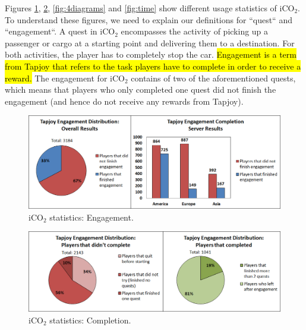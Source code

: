 \documentclass[preprint,authoryear,12pt]{elsarticle}
\newcommand{\hlc}[2][yellow]{ {\sethlcolor{#1} \hl{#2}} }
\begin{document}
Figures \ref{fig:engagement}, \ref{fig:completion}, \ref{fig:4diagrams} and \ref{fig:time} show different usage statistics of iCO$_2$. To understand these figures, we need to explain our definitions for ``quest`` and ``engagement``. A quest in iCO$_2$ encompasses the activity of picking up a passenger or cargo at a starting point and delivering them to a destination. For both activities, the player has to completely stop the car. 
\hlc[green]{Engagement is a term from Tapjoy that refers to the task players have to complete in order to receive a reward.} The engagement for iCO$_2$ contains of two of the aforementioned quests, which means that players who only completed one quest did not finish the engagement (and hence do not receive any rewards from Tapjoy).

\begin{figure}[htb]
	\begin{center}
		\includegraphics[width=.95\linewidth]{ijhcs14-img/engagement}
		\caption{iCO$_2$ statistics: Engagement.\label{fig:engagement}}
	\end{center}
\end{figure}

\begin{figure}[htb]
	\begin{center}
		\includegraphics[width=.95\linewidth]{ijhcs14-img/completion}
		\caption{iCO$_2$ statistics: Completion.\label{fig:completion}}
	\end{center}
\end{figure}
\end{document}
